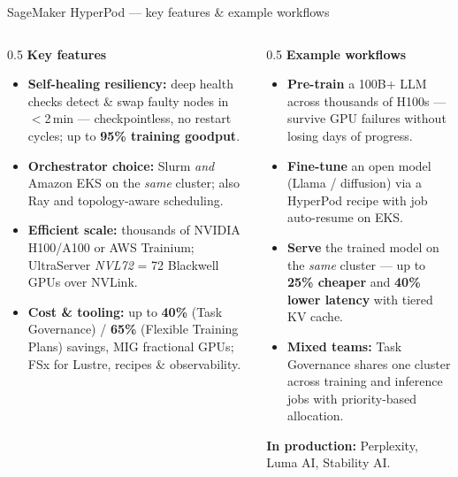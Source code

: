\documentclass[aspectratio=169]{beamer}
\begin{document}
\begin{frame}{SageMaker HyperPod --- key features \& example workflows}
\footnotesize
\begin{columns}[t]
  \begin{column}{0.5\textwidth}
    \textbf{Key features}
    \begin{itemize}\setlength\itemsep{5pt}
      \item \textbf{Self-healing resiliency:} deep health checks detect \& swap faulty nodes in
            $<$2\,min --- checkpointless, no restart cycles; up to \textbf{95\% training goodput}.
      \item \textbf{Orchestrator choice:} Slurm \emph{and} Amazon EKS on the \emph{same} cluster;
            also Ray and topology-aware scheduling.
      \item \textbf{Efficient scale:} thousands of NVIDIA H100/A100 or AWS Trainium; UltraServer
            \emph{NVL72} = 72 Blackwell GPUs over NVLink.
      \item \textbf{Cost \& tooling:} up to \textbf{40\%} (Task Governance) / \textbf{65\%} (Flexible
            Training Plans) savings, MIG fractional GPUs; FSx for Lustre, recipes \& observability.
    \end{itemize}
  \end{column}
  \begin{column}{0.5\textwidth}
    \textbf{Example workflows}
    \begin{itemize}\setlength\itemsep{4pt}
      \item \textbf{Pre-train} a 100B+ LLM across thousands of H100s --- survive GPU failures
            without losing days of progress.
      \item \textbf{Fine-tune} an open model (Llama / diffusion) via a HyperPod recipe with
            job auto-resume on EKS.
      \item \textbf{Serve} the trained model on the \emph{same} cluster --- up to \textbf{25\%
            cheaper} and \textbf{40\% lower latency} with tiered KV cache.
      \item \textbf{Mixed teams:} Task Governance shares one cluster across training and inference
            jobs with priority-based allocation.
    \end{itemize}

    \vspace{4pt}
    \textbf{In production:} Perplexity, Luma AI, Stability AI.
  \end{column}
\end{columns}
\end{frame}
\end{document}
